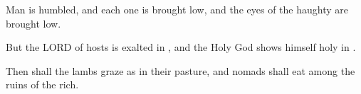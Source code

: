 \documentclass[11pt]{article}
\begin{document}
\begin{biblicaloutline}[Isaiah 5:15-17 (C)]

    \begin{versesection}{2em}
         Man is humbled, and each one is brought low,
        \poetryline and the eyes of the haughty are brought low.
        
         But the LORD of hosts is exalted in ,
        \poetryline and the Holy God shows himself holy in .
        
         Then shall the lambs graze as in their pasture,
        \poetryline and nomads shall eat among the ruins of the rich.
    \end{versesection}

\end{biblicaloutline}
\end{document}
